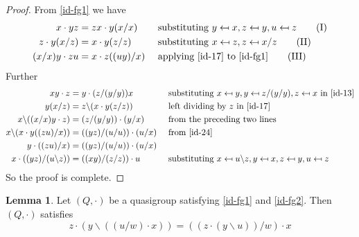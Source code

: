 \documentclass[12pt, twoside, openright]{report}
\theoremstyle{definition}
\newtheorem{lem}[thm]{Lemma}
\newcommand{\ldv}{\backslash}       %
\newcommand{\rdv}{/}                %
\begin{document}
\begin{proof}
  From \ref{id-fg1} we have
  \begin{alignat*}{2}
    x\cdot yz &= zx\cdot y(x\rdv x) &&\text{ substituting
      $y\mapsfrom x, z\mapsfrom y, u\mapsfrom z$}\label{id-13} \tag{I}\\
    z\cdot y(x\rdv z) &= x\cdot y(z\rdv z) &&\text{
      substituting $x\mapsfrom z, z\mapsfrom x\rdv z$} \label{id-17} \tag{II}\\
    (x\rdv x)y \cdot zu &= x\cdot z((uy)\rdv x) &&\text{
      applying \ref{id-17} to \ref{id-fg1}} \label{id-24} \tag{III}
  \end{alignat*}
  Further
  \begin{alignat*}{2}
    xy\cdot z &= y\cdot (z\rdv(y\rdv y))x &&\text{ substituting
      $x\mapsfrom y, y\mapsfrom z\rdv(y\rdv y), z\mapsfrom x$ in \ref{id-13}}\\
    y(x\rdv z) &= z\ldv(x\cdot y(z\rdv z)) &&\text{ left dividing by $z$ in \ref{id-17}}\\
    x\ldv((x\rdv x)y\cdot z) &= (z\rdv(y\rdv y))\cdot (y\rdv x)
      &&\text{ from the preceding two lines}\\
    x\ldv(x\cdot y((zu)\rdv x)) &= ((yz)\rdv (u\rdv u))\cdot (u\rdv x)
      &&\text{ from \ref{id-24}}\\
    y\cdot ((zu)\rdv x) &= ((yz)\rdv (u\rdv u))\cdot (u\rdv x) &&\\
    x\cdot ((yz)\rdv (u\ldv z)) &= ((xy)\rdv (z\rdv z))\cdot u &&\text{
      substituting $x\mapsfrom u\ldv z, y\mapsfrom x, z\mapsfrom y, u\mapsfrom z$}
  \end{alignat*}
  So the proof is complete.
\end{proof}

\begin{lem}\label{lem-groupiso}
  Let $(Q,\cdot)$ be a quasigroup satisfying \ref{id-fg1} and \ref{id-fg2}. Then $(Q, \cdot)$ satisfies
  \[z\cdot (y\ldv ((u\rdv w)\cdot x)) = ((z\cdot (y\ldv u))\rdv w)\cdot x\]
\end{lem}
\end{document}
